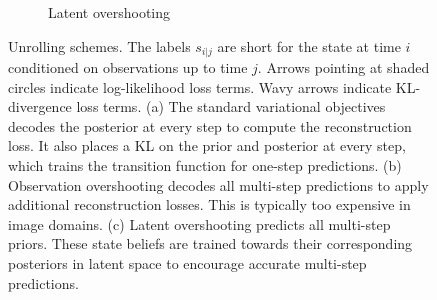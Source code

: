 \begin{figure}[t]
\begin{subfigure}[t]{.27\textwidth}
{\begin{tikzpicture}
\end{tikzpicture}}
\caption{Latent overshooting}
\label{fig:latov}
\end{subfigure}%
\hfil\hfil%
\caption{Unrolling schemes.
The labels $s_{i|j}$ are short for the state at time $i$ conditioned on observations up to time $j$.
Arrows pointing at shaded circles indicate log-likelihood loss terms. Wavy arrows indicate KL-divergence loss terms.
(a) The standard variational objectives decodes the posterior at every step to compute the reconstruction loss. It also places a KL on the prior and posterior at every step, which trains the transition function for one-step predictions.
(b) Observation overshooting \citep{amos2018awareness} decodes all multi-step predictions to apply additional reconstruction losses. This is typically too expensive in image domains.
(c) Latent overshooting predicts all multi-step priors. These state beliefs are trained towards their corresponding posteriors in latent space to encourage accurate multi-step predictions.}
\label{fig:overshooting}
\end{figure}

